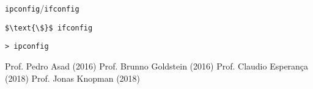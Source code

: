 \documentclass[12pt]{article}
\begin{document}
	\begin{interlude}{\texttt{ipconfig}/\texttt{ifconfig}}
	
	\begin{lstlisting}
$\text{\$}$ ifconfig
	\end{lstlisting}
	
	\begin{lstlisting}
> ipconfig
	\end{lstlisting}	
	
	\end{interlude}
	
	\begin{thebibliography}{99}
	 Prof. Pedro Asad (2016)
	 Prof. Brunno Goldstein (2016)
	 Prof. Claudio Esperança (2018)
	 Prof. Jonas Knopman (2018)
	\end{thebibliography}
\end{document}

